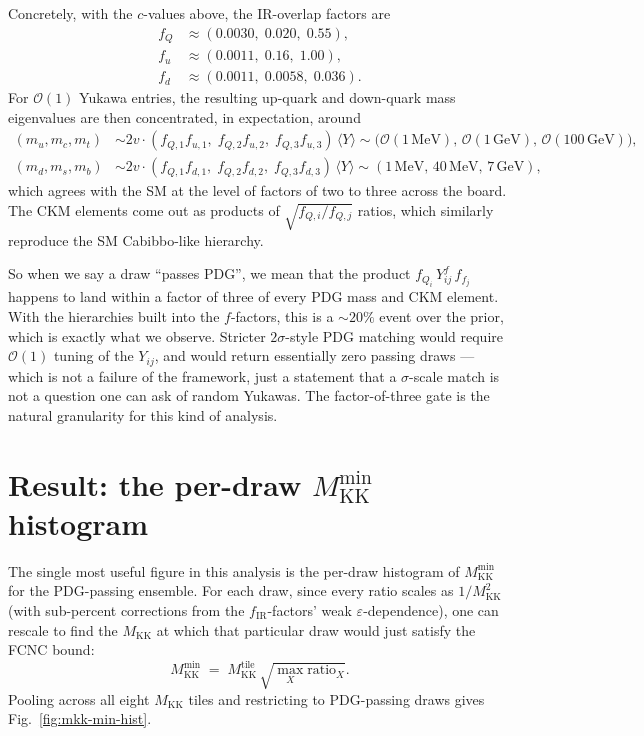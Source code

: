 \documentclass[11pt]{article}
\newcommand{\Mkk}{M_{\mathrm{KK}}}
\newcommand{\fIR}{f_{\mathrm{IR}}}
\begin{document}
Concretely, with the $c$-values above, the IR-overlap factors are
\begin{align}
  f_Q &\approx (0.0030,\;0.020,\;0.55),\nonumber\\
  f_u &\approx (0.0011,\;0.16,\;1.00),\\
  f_d &\approx (0.0011,\;0.0058,\;0.036).\nonumber
\end{align}
For $\mathcal{O}(1)$ Yukawa entries, the resulting up-quark and down-quark
mass eigenvalues are then concentrated, in expectation, around
\begin{align}
  (m_u, m_c, m_t) &\sim 2v \cdot (f_{Q,1}f_{u,1},\;f_{Q,2}f_{u,2},\;
                                  f_{Q,3}f_{u,3})\,\langle Y\rangle
                  \sim \bigl(\mathcal{O}(1\,\mathrm{MeV}),\,
                              \mathcal{O}(1\,\mathrm{GeV}),\,
                              \mathcal{O}(100\,\mathrm{GeV})\bigr),
                  \nonumber\\
  (m_d, m_s, m_b) &\sim 2v \cdot (f_{Q,1}f_{d,1},\;f_{Q,2}f_{d,2},\;
                                  f_{Q,3}f_{d,3})\,\langle Y\rangle
                  \sim (1\,\mathrm{MeV},\,40\,\mathrm{MeV},\,7\,\mathrm{GeV}),
\end{align}
which agrees with the SM at the level of factors of two to three across
the board. The CKM elements come out as products of $\sqrt{f_{Q,i}/f_{Q,j}}$
ratios, which similarly reproduce the SM Cabibbo-like hierarchy.

So when we say a draw ``passes PDG'', we mean that the product
$f_{Q_i}\,Y^{f}_{ij}\,f_{f_j}$ happens to land within a factor of three
of every PDG mass and CKM element. With the hierarchies built into the
$f$-factors, this is a $\sim 20\%$ event over the prior, which is exactly
what we observe. Stricter $2\sigma$-style PDG matching would require
$\mathcal{O}(1)$ tuning of the $Y_{ij}$, and would return essentially zero
passing draws --- which is not a failure of the framework, just a
statement that a $\sigma$-scale match is not a question one can ask of
random Yukawas. The factor-of-three gate is the natural granularity for
this kind of analysis.

\section{Result: the per-draw \texorpdfstring{$\Mkk^{\min}$}{M\_KK\^min} histogram}
\label{sec:result}

The single most useful figure in this analysis is the per-draw histogram
of $\Mkk^{\min}$ for the PDG-passing ensemble. For each draw, since every
ratio scales as $1/\Mkk^2$ (with sub-percent corrections from the
$\fIR$-factors' weak $\varepsilon$-dependence), one can rescale to find
the $\Mkk$ at which that particular draw would just satisfy the FCNC
bound:
\begin{equation}
  \Mkk^{\min} \;=\; \Mkk^{\mathrm{tile}}\,
                    \sqrt{\max_X \mathrm{ratio}_X}.
\end{equation}
Pooling across all eight $\Mkk$ tiles and restricting to PDG-passing
draws gives Fig.~\ref{fig:mkk-min-hist}.
\end{document}

